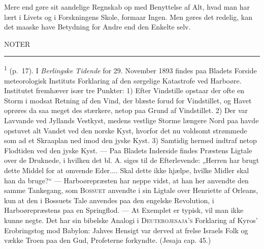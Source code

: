 \documentclass[12pt,a4paper,openany]{book}
\newcommand{\opage}[1]{\marginnote{\footnotesize\textit{[#1]}}}
\begin{document}
Mere end gøre sit aandelige Regnskab op med Benyttelse af Alt, hvad man
har lært i Livets og i Forskningens Skole, formaar Ingen. Men gøres det
redelig, kan det maaske have Betydning for Andre end den Enkelte selv.

\clearpage

\opage{245}\begin{center}NOTER\\[2pt]\rule{1.5cm}{0.6pt}\end{center}

\begin{small}

\textsuperscript{1} (p.~17). I \textit{Berlingske Tidende} for 29.
November 1893 findes paa Bladets
Forside meteorologisk Instituts Forklaring af den sørgelige Katastrofe
ved Harboøre. Institutet fremhæver især tre Punkter: 1) Efter Vindstille
opstaar der ofte en Storm i modsat Retning af den Vind, der blæste forud
for Vindstillet, og Havet oprøres da saa meget des stærkere, netop paa
Grund af Vindstillet. 2) Der var Lavvande ved Jyllands Vestkyst, medens
vestlige Storme længere Nord paa havde opstuvet alt Vandet ved den
norske Kyst, hvorfor det nu voldsomt strømmede som ad et Skraaplan ned
imod den jyske Kyst. 3) Samtidig hermed indtraf netop Flodtiden ved den
jyske Kyst. --- Paa Bladets Inderside findes Præstens Ligtale over de
Druknede, i hvilken det bl. A. siges til de Efterlevende: „Herren har
brugt dette Middel for at omvende Eder.... Skal dette ikke hjælpe,
hvilke Midler skal han da bruge?“ --- Harboørepræsten har neppe vidst,
at han her anvendte den samme Tankegang, som \textsc{Bossuet} anvendte i
sin Ligtale over Henriette af Orleans, kun at den i Bossuets Tale
anvendes paa den engelske Revolution, i Harboørepræstens paa en
Springflod. --- At Exemplet er typisk, vil man ikke kunne negte. Det har
sin bibelske Analogi i \textsc{Deuterojesaja’s} Forklaring af Kyros’
Erobringstog mod Babylon: Jahves Hensigt var derved at frelse Israels
Folk og vække Troen paa den Gud, Profeterne forkyndte. (Jesaja cap. 45.)


\end{small}
\end{document}
